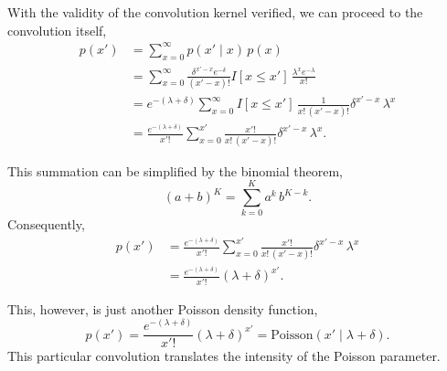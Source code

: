 \documentclass[11pt, oneside]{article}
\begin{document}
With the validity of the convolution kernel verified, we can proceed
to the convolution itself,
%
\begin{align*}
p ( x' )
&=
\sum_{x = 0}^{ \infty }
p( x' \mid x ) \, p (x)
\\
&=
\sum_{x = 0}^{ \infty }
\frac{ \delta^{x' - x} e^{-\delta} }{ (x' - x)! } I[ x \le x' ] \,
\frac{ \lambda^{x} e^{-\lambda} }{ x! }
\\
&=
e^{-(\lambda + \delta)} 
\sum_{x = 0}^{ \infty }
I[ x \le x' ] \,
\frac{ 1 }{ x! \, (x' - x)! }
\delta^{x' - x} \, \lambda^{x}
\\
&=
\frac{ e^{-(\lambda + \delta)} }{ x'! }
\sum_{x = 0}^{ x' }
\frac{ x'! }{ x! \, (x' - x)! }
\delta^{x' - x} \, \lambda^{x}.
\end{align*}

This summation can be simplified by the binomial theorem,
%
\begin{equation*}
( a + b )^{K} = \sum_{k = 0}^{K} a^{k} \, b^{K - k}.
\end{equation*}
%
Consequently,
%
\begin{align*}
p ( x' )
&=
\frac{ e^{-(\lambda + \delta)} }{ x'! }
\sum_{x = 0}^{ x' }
\frac{ x'! }{ x! \, (x' - x)! }
\delta^{x' - x} \, \lambda^{x}
\\
&=
\frac{ e^{-(\lambda + \delta)} }{ x'! }
(\lambda + \delta)^{x'}.
\end{align*}

This, however, is just another Poisson density function,
%
\begin{equation*}
p ( x' )
=
\frac{ e^{-(\lambda + \delta)} }{ x'! }
(\lambda + \delta)^{x'}
=
\text{Poisson}( x' \mid \lambda + \delta ).
\end{equation*}
%
This particular convolution translates the intensity of the 
Poisson parameter.
\end{document}

